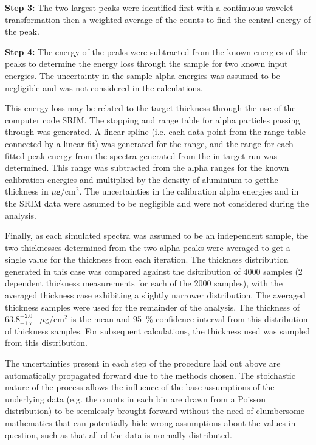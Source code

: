 \textbf{Step 3:}
  The two largest peaks were identified first with a continuous wavelet
  transformation then a weighted average of the counts to find the central
  energy of the peak.

\textbf{Step 4:}
  The energy of the peaks were subtracted from the known energies of the
  peaks to determine the energy loss through the sample for two known
  input energies. The uncertainty in the sample alpha energies was
  assumed to be negligible and was not considered in the calculations.

This energy loss may be related to the target thickness through the use
of the computer code SRIM. The stopping and range table for alpha
particles passing through  was generated. A linear spline
(i.e. each data point from the range table connected by a linear fit)
was generated for the range, and the range for each fitted peak energy
from the spectra generated from the in-target run was determined. This
range was subtracted from the alpha ranges for the known calibration
energies and multiplied by the density of aluminium to getthe thickness
in $\mu$g/cm${}^{2}$. The uncertainties in the calibration alpha energies and
in the SRIM data were assumed to be negligible and were not considered
during the analysis.

Finally, as each simulated spectra was assumed to be an independent
sample, the two thicknesses determined from the two alpha peaks were
averaged to get a single value for the thickness from each iteration.
The thickness distribution generated in this case was compared against
the dsitribution of 4000 samples (2 dependent thickness measurements for
each of the 2000 samples), with the averaged thickness case exhibiting a
slightly narrower distribution. The averaged thickness samples were used
for the remainder of the analysis. The thickness of $63.8^{+2.0}_{-1.7}$~
$\mu$g/cm${}^{2}$ is the mean and 95\, \% confidence interval from this
distribution of thickness samples. For subsequent calculations, the
thickness used was sampled from this distribution.

The uncertainties present in each step of the procedure laid out above
are automatically propagated forward due to the methods chosen. The
stoichastic nature of the process allows the influence of the base
assumptions of the underlying data (e.g. the counts in each bin are
drawn from a Poisson distribution) to be seemlessly brought forward
without the need of clumbersome mathematics that can potentially hide
wrong assumptions about the values in question, such as that all of the
data is normally distributed.

